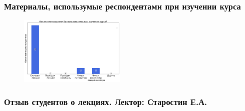 	\subsubsection{Материалы, использумые респондентами при изучении курса}

		\begin{figure}[H]
			\centering
			\includegraphics[width = 0.45\textwidth]{images/4 course/Основы финансово-экономического анализа и планирования/materials.png}
		\end{figure}


	\subsubsection{Отзыв студентов о лекциях. Лектор: Старостин Е.А.}

